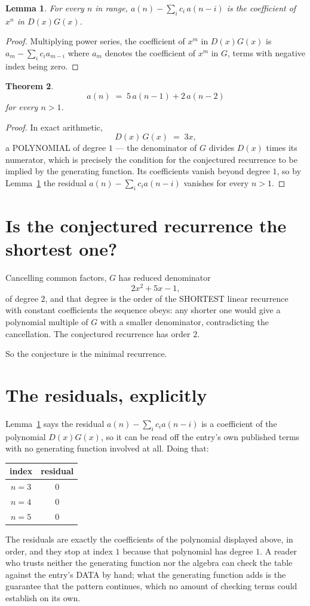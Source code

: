 \documentclass[11pt,a4paper]{article}
\theoremstyle{plain}
\newtheorem{theorem}{Theorem}
\newtheorem{lemma}[theorem]{Lemma}
\theoremstyle{definition}
\begin{document}
\begin{lemma}\label{lem:key}
For every $n$ in range, $a(n)-\sum_i c_i\,a(n-i)$ is the coefficient of $x^{n}$ in
$D(x)G(x)$.
\end{lemma}

\begin{proof}
Multiplying power series, the coefficient of $x^{m}$ in $D(x)G(x)$ is
$a_m-\sum_i c_i a_{m-i}$ where $a_m$ denotes the coefficient of $x^{m}$ in $G$, terms with
negative index being zero.
\end{proof}

\begin{theorem}
\[
a(n)\;=\;5\,a(n-1) + 2\,a(n-2)
\]
for every $n>1$.
\end{theorem}

\begin{proof}
In exact arithmetic,
\[
D(x)\,G(x)\;=\;3 x,
\]
a POLYNOMIAL of degree $1$ --- the denominator of $G$ divides $D(x)$ times its numerator,
which is precisely the condition for the conjectured recurrence to be implied by the
generating function. Its coefficients vanish beyond degree $1$, so by
Lemma~\ref{lem:key} the residual $a(n)-\sum_ic_ia(n-i)$ vanishes for every
$n>1$.
\end{proof}

\section{Is the conjectured recurrence the shortest one?}

Cancelling common factors, $G$ has reduced denominator
\[
2 x^{2} + 5 x - 1,
\]
of degree $2$, and that degree is the order of the SHORTEST linear recurrence with
constant coefficients the sequence obeys: any shorter one would give a polynomial multiple of
$G$ with a smaller denominator, contradicting the cancellation. The conjectured recurrence has
order $2$.

So the conjecture is the minimal recurrence.

\section{The residuals, explicitly}

Lemma~\ref{lem:key} says the residual $a(n)-\sum_ic_ia(n-i)$ is a coefficient of the
polynomial $D(x)G(x)$, so it can be read off the entry's own published terms with no
generating function involved at all. Doing that:
\begin{center}
\begin{tabular}{cc}
index & residual \\ \hline
$n=3$ & $0$ \\
$n=4$ & $0$ \\
$n=5$ & $0$
\end{tabular}
\end{center}
The residuals are exactly the coefficients of the polynomial displayed above, in order, and
they stop at index $1$ because that polynomial has degree $1$. A reader who trusts
neither the generating function nor the algebra can check the table against the entry's DATA
by hand; what the generating function adds is the guarantee that the pattern continues, which
no amount of checking terms could establish on its own.
\end{document}
